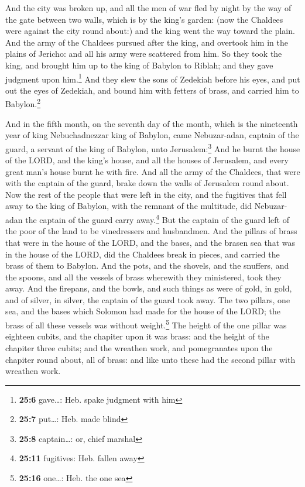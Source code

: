  And the city was broken up, and all the men of war fled
by night by the way of the gate between two walls, which is by the
king's garden: (now the Chaldees were against the city round about:) and
the king went the way toward the plain.  And the army of
the Chaldees pursued after the king, and overtook him in the plains of
Jericho: and all his army were scattered from him.  So
they took the king, and brought him up to the king of Babylon to Riblah;
and they gave judgment upon him.\footnote{\textbf{25:6} gave\ldots: Heb.
  spake judgment with him}  And they slew the sons of
Zedekiah before his eyes, and put out the eyes of Zedekiah, and bound
him with fetters of brass, and carried him to Babylon.\footnote{\textbf{25:7}
  put\ldots: Heb. made blind}

 And in the fifth month, on the seventh day of the month,
which is the nineteenth year of king Nebuchadnezzar king of Babylon,
came Nebuzar-adan, captain of the guard, a servant of the king of
Babylon, unto Jerusalem:\footnote{\textbf{25:8} captain\ldots: or, chief
  marshal}  And he burnt the house of the LORD, and the
king's house, and all the houses of Jerusalem, and every great man's
house burnt he with fire.  And all the army of the
Chaldees, that were with the captain of the guard, brake down the walls
of Jerusalem round about.  Now the rest of the people
that were left in the city, and the fugitives that fell away to the king
of Babylon, with the remnant of the multitude, did Nebuzar-adan the
captain of the guard carry away.\footnote{\textbf{25:11} fugitives: Heb.
  fallen away}  But the captain of the guard left of the
poor of the land to be vinedressers and husbandmen.  And
the pillars of brass that were in the house of the LORD, and the bases,
and the brasen sea that was in the house of the LORD, did the Chaldees
break in pieces, and carried the brass of them to Babylon.
 And the pots, and the shovels, and the snuffers, and the
spoons, and all the vessels of brass wherewith they ministered, took
they away.  And the firepans, and the bowls, and such
things as were of gold, in gold, and of silver, in silver, the captain
of the guard took away.  The two pillars, one sea, and
the bases which Solomon had made for the house of the LORD; the brass of
all these vessels was without weight.\footnote{\textbf{25:16} one\ldots:
  Heb. the one sea}  The height of the one pillar was
eighteen cubits, and the chapiter upon it was brass: and the height of
the chapiter three cubits; and the wreathen work, and pomegranates upon
the chapiter round about, all of brass: and like unto these had the
second pillar with wreathen work.

